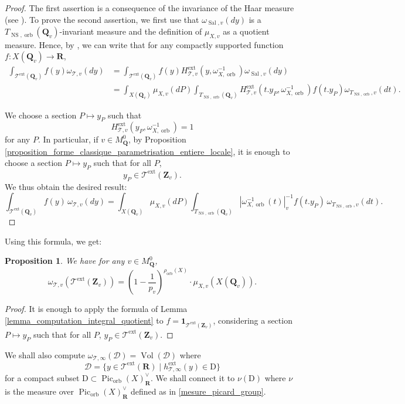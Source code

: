 \documentclass{proc-l}
\newcommand{\R}{\mathbf{R}}
\newcommand{\Z}{\mathbf{Z}}
\newcommand{\Q}{\mathbf{Q}}
\DeclareMathOperator{\Pic}{Pic}
\DeclareMathOperator{\Vol}{Vol}
\DeclareMathOperator{\NS}{NS}
\DeclareMathOperator{\orb}{orb}
\DeclareMathOperator{\ext}{ext}
\DeclareMathOperator{\Sal}{Sal}
\newcommand{\stackT}{\mathcal{T}}
\newcommand{\w}{\omega}
\newtheorem{prop}[theorem]{Proposition}
\theoremstyle{definition}
\theoremstyle{remark}
\numberwithin{equation}{section}
\begin{document}
\begin{proof}
The first assertion is a consequence of the invariance of the Haar measure (see \cite[Chapitre VII, §2, n°2, proposition 1]{bourbaki2007integration}). To prove the second assertion, we first use that $\w_{\Sal,v}(dy)$ is a $T_{\NS,\orb}(\Q_v)$-invariant measure and the definition of $\mu_{X,v}$ as a quotient measure. Hence, by \cite[Chapitre VII, §2, n°2, Proposition 4]{bourbaki2007integration}, we can write that for any compactly supported function $f : X(\Q_v) \rightarrow \R$,
\begin{align*}
\int_{\stackT^{\ext}(\Q_v)} f(y) \w_{\stackT,v}(dy)
&= \int_{\stackT^{\ext}(\Q_v)} f(y) H_{\stackT,v}^{\ext}(y,\w_{X,\orb}^{-1}) \w_{\Sal,v}(dy) \\
&= \int_{X(\Q_v)} \mu_{X,v}(dP)
\int_{T_{\NS,\orb}(\Q_v)} H_{\stackT,v}^{\ext}(t.y_P,\w_{X,\orb}^{-1}) f(t.y_P) \w_{T_{\NS,\orb},v}(dt).
\end{align*}

We choose a section $P \mapsto y_P$ such that
$$
H_{\stackT,v}^{\ext}(y_P,\w_{X,\orb}^{-1}) = 1
$$
for any $P$. In particular, if $v \in M_{\Q}^0$, by Proposition \ref{proposition_forme_classique_parametrisation_entiere_locale}, it is enough to choose a section $P \mapsto y_P$ such that for all $P$,
$$
y_P \in \stackT^{\ext}(\Z_v).
$$We thus obtain the desired result:
\[
 \int_{\stackT^{\ext}(\Q_v)} f(y)\,\w_{\stackT,v}(dy)
 =
 \int_{X(\Q_v)} \mu_{X,v}(dP)
 \int_{T_{\NS,\orb}(\Q_v)}
 |\w_{X,\orb}^{-1}(t)|_{v}^{-1} f(t.y_P)\,\w_{T_{\NS,\orb},v}(dt).
\]

\end{proof}

Using this formula, we get:

\begin{prop}\label{proposition_finite_place_quotient_measure_over_X}
    We have for any $v \in M_{\Q}^0$, 
    $$\w_{\stackT,v}(\stackT^{\ext}(\Z_v)) = \left( 1 - \frac{1}{p_v} \right)^{\rho_{\orb}(X)} \cdot \mu_{X,v}\left(X(\Q_v)\right) .$$
\end{prop}

\begin{proof}
    It is enough to apply the formula of Lemma \ref{lemma_computation_integral_quotient} to $f = \mathbf{1}_{\stackT^{\ext}(\Z_v)}$, considering a section $P \mapsto y_P$ such that for all $P$, $y_P \in \stackT^{\ext}(\Z_v)$.
\end{proof}

We shall also compute $\w_{\stackT,\infty}(\mathcal{D}) = \Vol(\mathcal{D})$ where $$\mathcal{D} = \{ y \in \stackT^{\ext}(\R) \mid h^{\ext}_{\stackT,\infty}(y) \in \mathrm{D} \}$$ for a compact subset $\mathrm{D} \subset \Pic_{\orb}(X)^{\vee}_{\R}$. We shall connect it to $\nu(\mathrm{D})$ where $\nu$ is the measure over $\Pic_{\orb}(X)^{\vee}_{\R}$ defined as in \ref{mesure_picard_group}.
\end{document}
